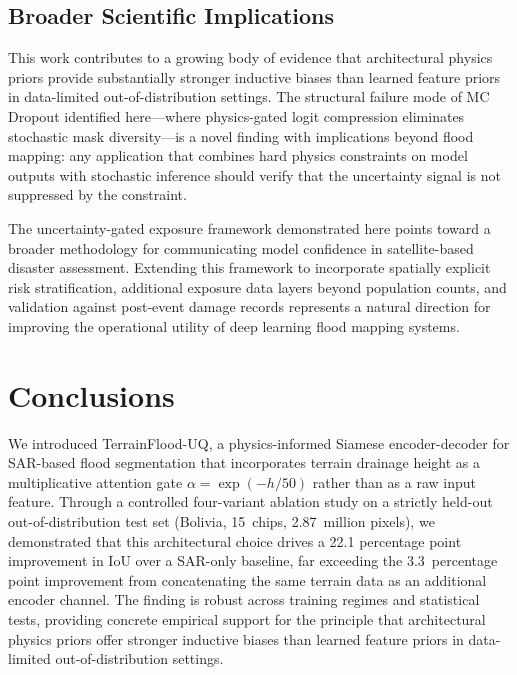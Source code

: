 \documentclass[12pt,oneside]{report}
\begin{document}
\section{Broader Scientific Implications}

This work contributes to a growing body of evidence that architectural physics
priors provide substantially stronger inductive biases than learned feature
priors in data-limited out-of-distribution settings.
The structural failure mode of MC Dropout identified here---where physics-gated
logit compression eliminates stochastic mask diversity---is a novel finding
with implications beyond flood mapping: any application that combines hard
physics constraints on model outputs with stochastic inference should verify
that the uncertainty signal is not suppressed by the constraint.

The uncertainty-gated exposure framework demonstrated here points toward a
broader methodology for communicating model confidence in satellite-based
disaster assessment.
Extending this framework to incorporate spatially explicit risk stratification,
additional exposure data layers beyond population counts, and validation against
post-event damage records represents a natural direction for improving the
operational utility of deep learning flood mapping systems.

\chapter{Conclusions}
\label{ch:conclusions}

We introduced TerrainFlood-UQ, a physics-informed Siamese encoder-decoder for
SAR-based flood segmentation that incorporates terrain drainage height as a
multiplicative attention gate $\alpha = \exp(-h/50)$ rather than as a raw
input feature.
Through a controlled four-variant ablation study on a strictly held-out
out-of-distribution test set (Bolivia, 15~chips, 2.87~million pixels), we
demonstrated that this architectural choice drives a 22.1 percentage point
improvement in IoU over a SAR-only baseline, far exceeding the 3.3~percentage
point improvement from concatenating the same terrain data as an additional
encoder channel.
The finding is robust across training regimes and statistical tests, providing
concrete empirical support for the principle that architectural physics priors
offer stronger inductive biases than learned feature priors in data-limited
out-of-distribution settings.
\end{document}
